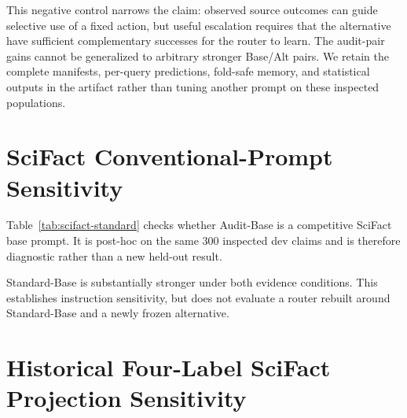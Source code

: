 \documentclass[runningheads]{llncs}
\begin{document}
This negative control narrows the claim: observed source outcomes can guide
selective use of a fixed action, but useful escalation requires that the
alternative have sufficient complementary successes for the router to learn.
The audit-pair gains cannot be generalized to arbitrary stronger Base/Alt
pairs. We retain the complete manifests, per-query predictions, fold-safe
memory, and statistical outputs in the artifact rather than tuning another
prompt on these inspected populations.

\section{SciFact Conventional-Prompt Sensitivity}
\label{sec:scifact-standard-control}

Table~\ref{tab:scifact-standard} checks whether Audit-Base is
a competitive SciFact base prompt. It is post-hoc on the same 300 inspected dev
claims and is therefore diagnostic rather than a new held-out result.

\clearpage
\begin{table}[t]
\caption{SciFact prompt sensitivity on the same dev claims. Deltas orient the
three-label Standard-Base minus Audit-Base; intervals are paired
claim bootstraps.}
\label{tab:scifact-standard}
\centering\small
{}
\end{table}

Standard-Base is substantially stronger under both evidence
conditions. This establishes instruction sensitivity, but does not evaluate a
router rebuilt around Standard-Base and a newly frozen alternative.

\section{Historical Four-Label SciFact Projection Sensitivity}
\label{sec:scifact-projection}
\end{document}
